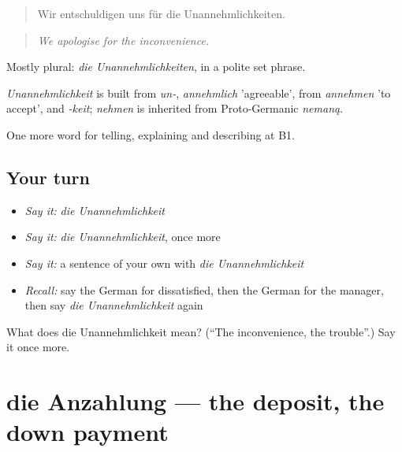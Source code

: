 \begin{quote}
Wir entschuldigen uns für die Unannehmlichkeiten.
\end{quote}

\begin{quote}
\emph{We apologise for the inconvenience.}
\end{quote}

Mostly plural: \emph{die Unannehmlichkeiten}, in a polite set phrase.

\begin{cousinweb}
\emph{Unannehmlichkeit} is built from \emph{un-}, \emph{annehmlich} 'agreeable', from \emph{annehmen} 'to accept', and \emph{-keit}; \emph{nehmen} is inherited from Proto-Germanic \emph{nemaną}.
\end{cousinweb}

\begin{grammarlens}[title={What you've built}]
One more word for telling, explaining and describing at B1.
\end{grammarlens}

\subsection*{Your turn}
\begin{itemize}
\raggedright
  \item \emph{Say it:} \emph{die Unannehmlichkeit}
  \item \emph{Say it:} \emph{die Unannehmlichkeit}, once more
  \item \emph{Say it:} a sentence of your own with \emph{die Unannehmlichkeit}
  \item \emph{Recall:} say the German for dissatisfied, then the German for the manager, then say \emph{die Unannehmlichkeit} again
\end{itemize}

\begin{tcolorbox}[breakable,colback=teal!4,colframe=teal!35!black,title={Before you move on}]
What does die Unannehmlichkeit mean? (\textquotedblleft{}The inconvenience, the trouble\textquotedblright{}.) Say it once more.
\end{tcolorbox}
\section[die Anzahlung]{die Anzahlung — the deposit, the down payment}

\label{lesson:GE-C432-anzahlung}



